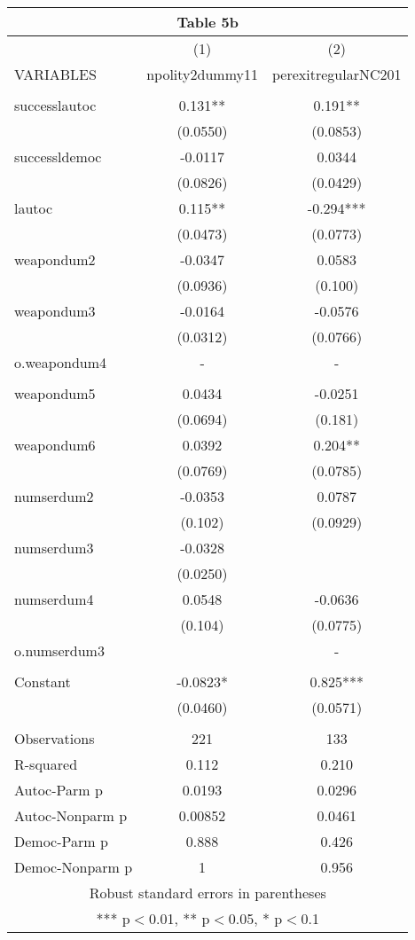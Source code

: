 \documentclass[]{article}
\begin{document}
\begin{tabular}{lcc}
\multicolumn{3}{c}{Table 5b} \\ \hline
 & (1) & (2) \\
VARIABLES & npolity2dummy11 & perexitregularNC201 \\ \hline
 &  &  \\
successlautoc & 0.131** & 0.191** \\
 & (0.0550) & (0.0853) \\
successldemoc & -0.0117 & 0.0344 \\
 & (0.0826) & (0.0429) \\
lautoc & 0.115** & -0.294*** \\
 & (0.0473) & (0.0773) \\
weapondum2 & -0.0347 & 0.0583 \\
 & (0.0936) & (0.100) \\
weapondum3 & -0.0164 & -0.0576 \\
 & (0.0312) & (0.0766) \\
o.weapondum4 & - & - \\
 &  &  \\
weapondum5 & 0.0434 & -0.0251 \\
 & (0.0694) & (0.181) \\
weapondum6 & 0.0392 & 0.204** \\
 & (0.0769) & (0.0785) \\
numserdum2 & -0.0353 & 0.0787 \\
 & (0.102) & (0.0929) \\
numserdum3 & -0.0328 &  \\
 & (0.0250) &  \\
numserdum4 & 0.0548 & -0.0636 \\
 & (0.104) & (0.0775) \\
o.numserdum3 &  & - \\
 &  &  \\
Constant & -0.0823* & 0.825*** \\
 & (0.0460) & (0.0571) \\
 &  &  \\
Observations & 221 & 133 \\
R-squared & 0.112 & 0.210 \\
Autoc-Parm p & 0.0193 & 0.0296 \\
Autoc-Nonparm p & 0.00852 & 0.0461 \\
Democ-Parm p & 0.888 & 0.426 \\
 Democ-Nonparm p & 1 & 0.956 \\ \hline
\multicolumn{3}{c}{ Robust standard errors in parentheses} \\
\multicolumn{3}{c}{ *** p$<$0.01, ** p$<$0.05, * p$<$0.1} \\
\end{tabular}
\end{document}
